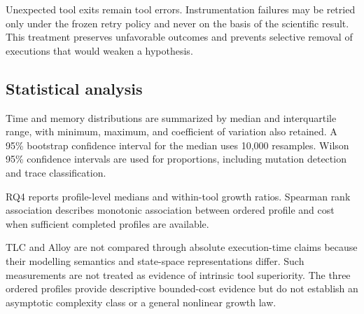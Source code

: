 Unexpected tool exits remain tool errors. Instrumentation failures may be
retried only under the frozen retry policy and never on the basis of the
scientific result. This treatment preserves unfavorable outcomes and prevents
selective removal of executions that would weaken a hypothesis.

\subsection{Statistical analysis}
\label{subsec:statistical-analysis}

Time and memory distributions are summarized by median and interquartile range,
with minimum, maximum, and coefficient of variation also retained. A 95\%
bootstrap confidence interval for the median uses 10,000 resamples. Wilson 95\%
confidence intervals are used for proportions, including mutation detection and
trace classification.

RQ4 reports profile-level medians and within-tool growth ratios. Spearman rank
association describes monotonic association between ordered profile and cost
when sufficient completed profiles are available.

TLC and Alloy are not compared through absolute execution-time claims because
their modelling semantics and state-space representations differ. Such
measurements are not treated as evidence of intrinsic tool superiority. The
three ordered profiles provide descriptive bounded-cost evidence but do not
establish an asymptotic complexity class or a general nonlinear growth law.
